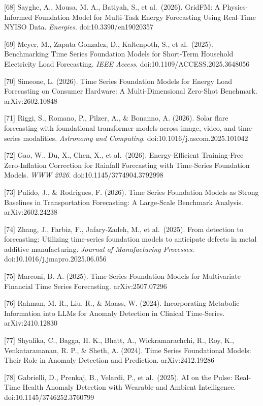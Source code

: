 {[}68{]} Sayghe, A., Mousa, M. A., Batiyah, S., et al.~(2026). GridFM: A Physics-Informed Foundation Model for Multi-Task Energy Forecasting Using Real-Time NYISO Data. \emph{Energies}. doi:10.3390/en19020357

{[}69{]} Meyer, M., Zapata Gonzalez, D., Kaltenpoth, S., et al.~(2025). Benchmarking Time Series Foundation Models for Short-Term Household Electricity Load Forecasting. \emph{IEEE Access}. doi:10.1109/ACCESS.2025.3648056

{[}70{]} Simeone, L. (2026). Time Series Foundation Models for Energy Load Forecasting on Consumer Hardware: A Multi-Dimensional Zero-Shot Benchmark. arXiv:2602.10848

{[}71{]} Riggi, S., Romano, P., Pilzer, A., \& Bonanno, A. (2026). Solar flare forecasting with foundational transformer models across image, video, and time-series modalities. \emph{Astronomy and Computing}. doi:10.1016/j.ascom.2025.101042

{[}72{]} Gao, W., Du, X., Chen, X., et al.~(2026). Energy-Efficient Training-Free Zero-Inflation Correction for Rainfall Forecasting with Time-Series Foundation Models. \emph{WWW 2026}. doi:10.1145/3774904.3792998

{[}73{]} Pulido, J., \& Rodrigues, F. (2026). Time Series Foundation Models as Strong Baselines in Transportation Forecasting: A Large-Scale Benchmark Analysis. arXiv:2602.24238

{[}74{]} Zhang, J., Farbiz, F., Jafary-Zadeh, M., et al.~(2025). From detection to forecasting: Utilizing time-series foundation models to anticipate defects in metal additive manufacturing. \emph{Journal of Manufacturing Processes}. doi:10.1016/j.jmapro.2025.06.056

{[}75{]} Marconi, B. A. (2025). Time Series Foundation Models for Multivariate Financial Time Series Forecasting. arXiv:2507.07296

{[}76{]} Rahman, M. R., Liu, R., \& Maass, W. (2024). Incorporating Metabolic Information into LLMs for Anomaly Detection in Clinical Time-Series. arXiv:2410.12830

{[}77{]} Shyalika, C., Bagga, H. K., Bhatt, A., Wickramarachchi, R., Roy, K., Venkataramanan, R. P., \& Sheth, A. (2024). Time Series Foundational Models: Their Role in Anomaly Detection and Prediction. arXiv:2412.19286

{[}78{]} Gabrielli, D., Prenkaj, B., Velardi, P., et al.~(2025). AI on the Pulse: Real-Time Health Anomaly Detection with Wearable and Ambient Intelligence. doi:10.1145/3746252.3760799

